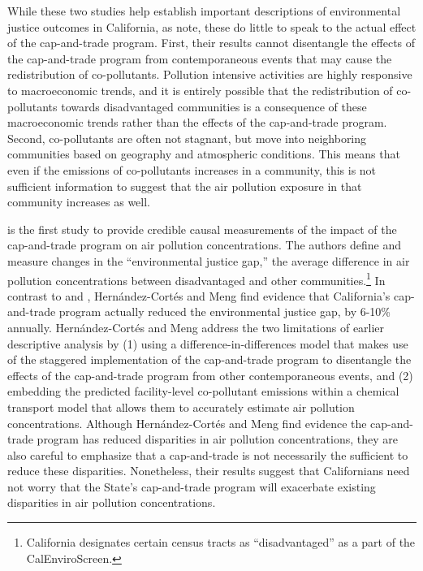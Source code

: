 While these two studies help establish important descriptions of environmental justice outcomes in California, as \cite{hernandez2022importance} note, these do little to speak to the actual effect of the cap-and-trade program. First, their results cannot disentangle the effects of the cap-and-trade program from contemporaneous events that may cause the redistribution of co-pollutants. Pollution intensive activities are highly responsive to macroeconomic trends, and it is entirely possible that the redistribution of co-pollutants towards disadvantaged communities is a consequence of these macroeconomic trends rather than the effects of the cap-and-trade program. Second, co-pollutants are often not stagnant, but move into neighboring communities based on geography and atmospheric conditions. This means that even if the emissions of co-pollutants increases in a community, this is not sufficient information to suggest that the air pollution exposure in that community increases as well. 

\cite{hernandez2023environmental} is the first study to provide credible causal measurements of the impact of the cap-and-trade program on air pollution concentrations. The authors define and measure changes in the ``environmental justice gap,'' the average difference in air pollution concentrations between disadvantaged and other communities.\footnote{California designates certain census tracts as ``disadvantaged” as a part of the CalEnviroScreen.} In contrast to \cite{cushing2018carbon} and \cite{pastor2022up}, Hernández-Cortés and Meng find evidence that California's cap-and-trade program actually reduced the environmental justice gap, by 6-10\% annually. Hernández-Cortés and Meng address the two limitations of earlier descriptive analysis by (1) using a difference-in-differences model that makes use of the staggered implementation of the cap-and-trade program to disentangle the effects of the cap-and-trade program from other contemporaneous events, and (2) embedding the predicted facility-level co-pollutant emissions within a chemical transport model that allows them to accurately estimate air pollution concentrations. Although Hernández-Cortés and Meng find evidence the cap-and-trade program has reduced disparities in air pollution concentrations, they are also careful to emphasize that a cap-and-trade is not necessarily the sufficient to reduce these disparities. Nonetheless, their results suggest that Californians need not worry that the State's cap-and-trade program will exacerbate existing disparities in air pollution concentrations. 

